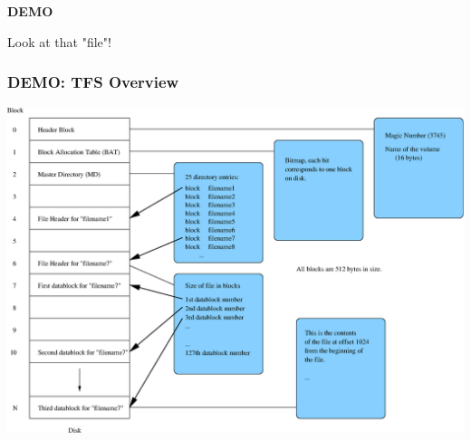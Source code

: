 \begin{frame}

\begin{center}

\Huge \textbf{DEMO}

\bigskip

\large Look at that "file"!

\end{center}

\end{frame}

\begin{frame}

\frametitle{DEMO: TFS Overview}

\begin{center}

\includegraphics[width=\textwidth]{figures/tfs}

\end{center}

\end{frame}


